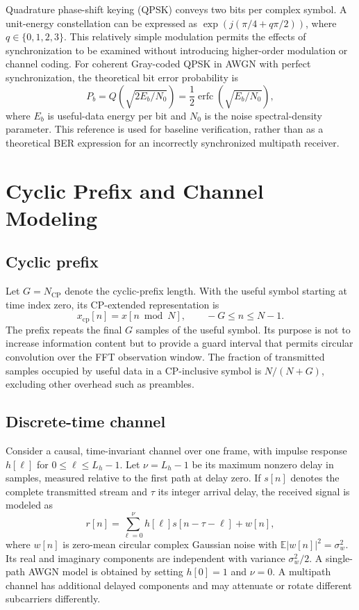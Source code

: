 Quadrature phase-shift keying (QPSK) conveys two bits per complex symbol. A unit-energy constellation can be expressed as $\exp(j(\pi/4+q\pi/2))$, where $q\in\{0,1,2,3\}$. This relatively simple modulation permits the effects of synchronization to be examined without introducing higher-order modulation or channel coding. For coherent Gray-coded QPSK in AWGN with perfect synchronization, the theoretical bit error probability \cite{proakis2008} is
\begin{equation}
 P_b=Q\left(\sqrt{2E_b/N_0}\right)
 =\frac{1}{2}\operatorname{erfc}\left(\sqrt{E_b/N_0}\right),
 \label{eq:qpsk_ber}
\end{equation}
where $E_b$ is useful-data energy per bit and $N_0$ is the noise spectral-density parameter. This reference is used for baseline verification, rather than as a theoretical BER expression for an incorrectly synchronized multipath receiver.

\section{Cyclic Prefix and Channel Modeling}
\subsection{Cyclic prefix}
Let $G=N_{\mathrm{CP}}$ denote the cyclic-prefix length. With the useful symbol starting at time index zero, its CP-extended representation is
\begin{equation}
 x_{\mathrm{cp}}[n]=x[n\bmod N],\qquad -G\leq n\leq N-1.
 \label{eq:cp_extension}
\end{equation}
The prefix repeats the final $G$ samples of the useful symbol. Its purpose is not to increase information content but to provide a guard interval that permits circular convolution over the FFT observation window. The fraction of transmitted samples occupied by useful data in a CP-inclusive symbol is $N/(N+G)$, excluding other overhead such as preambles.

\subsection{Discrete-time channel}
Consider a causal, time-invariant channel over one frame, with impulse response $h[\ell]$ for $0\leq\ell\leq L_h-1$. Let $\nu=L_h-1$ be its maximum nonzero delay in samples, measured relative to the first path at delay zero. If $s[n]$ denotes the complete transmitted stream and $\tau$ its integer arrival delay, the received signal is modeled as
\begin{equation}
 r[n]=\sum_{\ell=0}^{\nu}h[\ell]s[n-\tau-\ell]+w[n],
 \label{eq:channel_model}
\end{equation}
where $w[n]$ is zero-mean circular complex Gaussian noise with $\mathbb{E}|w[n]|^2=\sigma_w^2$. Its real and imaginary components are independent with variance $\sigma_w^2/2$. A single-path AWGN model is obtained by setting $h[0]=1$ and $\nu=0$. A multipath channel has additional delayed components and may attenuate or rotate different subcarriers differently.

